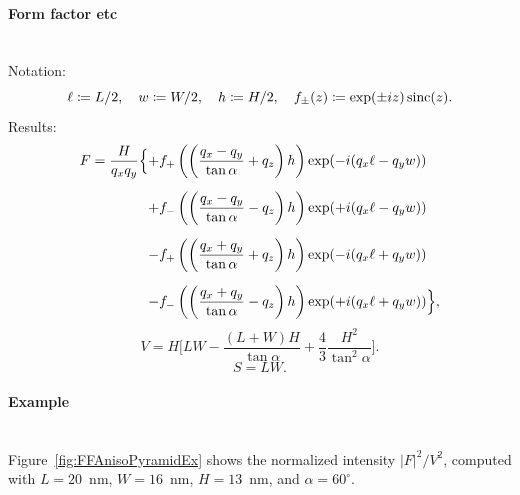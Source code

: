 \paragraph{Form factor etc}\strut\\
Notation:
\begin{displaymath}
  \ell\coloneqq L/2,\quad
  w\coloneqq W/2,\quad
  h\coloneqq H/2,\quad
  f_\pm(z)\coloneqq \exp(\pm i z)\operatorname{sinc}(z).
\end{displaymath}
Results:
\begin{equation*}
\begin{array}{@{}l@{}l@{}}
\DS F=
\frac{H}{q_xq_y} \Big\{
   &+\DS  f_+\left(\left(\frac{q_x-q_y}{\tan\alpha} +q_z\right)h\right)
        \exp(-i(q_x\ell-q_y w))
\\[3.6ex]
   &\DS+ f_-\left(\left(\frac{q_x-q_y}{\tan\alpha} -q_z\right)h\right)
        \exp(+i(q_x\ell-q_y w))
\\[3.6ex]
   &\DS- f_+\left(\left(\frac{q_x+q_y}{\tan\alpha} +q_z\right)h\right)
        \exp(-i(q_x\ell+q_y w))
\\[3.6ex]
   &\DS- f_-\left(\left(\frac{q_x+q_y}{\tan\alpha} -q_z\right)h\right)
        \exp(+i(q_x\ell+q_y w))
\Big\},
\end{array}
\end{equation*}
\begin{equation*}
  V= H \Big[LW - \dfrac{(L + W)H}{\tan\alpha} + \dfrac{4}{3} \dfrac{H^2}{\tan^2\alpha}\Big].
\end{equation*}
\begin{equation*}
  S=LW.
\end{equation*}

\paragraph{Example}\strut\\
Figure~\ref{fig:FFAnisoPyramidEx} shows the normalized intensity
$|F|^2/V^2$, computed with $L=20$~nm, $W=16$~nm, $H=13$~nm, and
$\alpha=60^{\circ}$.


